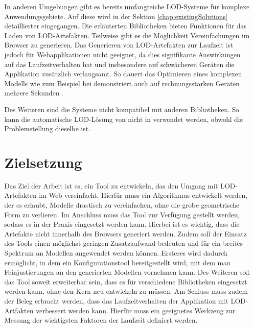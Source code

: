 In anderen Umgebungen gibt es bereits umfangreiche LOD-Systeme für komplexe Anwendungsgebiete. Auf diese wird in der Sektion \autoref{chap:existingSolutions} detaillierter eingegangen.
Die erläuterten Bibliotheken bieten Funktionen für das Laden von LOD-Artefakten. Teilweise gibt es die Möglichkeit Vereinfachungen im Browser zu generieren. Das Generieren von LOD-Artefakten zur Laufzeit ist jedoch für Webapplikationen nicht geeignet, da dies signifikante Auswirkungen auf das Laufzeitverhalten hat und insbesondere auf schwächeren Geräten die Applikation zusätzlich verlangsamt.
So dauert das Optimieren eines komplexen Modells wie zum Beispiel bei  demonstriert auch auf rechnungsstarken Geräten mehrere Sekunden \cite{babylonAutoLod}.

Des Weiteren sind die Systeme nicht kompatibel mit anderen Bibliotheken. So kann die automatische LOD-Lösung von  nicht in  verwendet werden, obwohl die Problemstellung dieselbe ist.

\section{Zielsetzung}
Das Ziel der Arbeit ist es, ein Tool zu entwickeln, das den Umgang mit LOD-Artefakten im Web vereinfacht. Hierfür muss ein Algorithmus entwickelt werden, der es erlaubt, Modelle drastisch zu vereinfachen, ohne die grobe geometrische Form zu verlieren. Im Anschluss muss das Tool zur Verfügung gestellt werden, sodass es in der Praxis eingesetzt werden kann. Hierbei ist es wichtig, dass die Artefakte nicht innerhalb des Browsers generiert werden. Zudem soll der Einsatz des Tools einen möglichst geringen Zusatzaufwand bedeuten und für ein breites Spektrum an Modellen angewendet werden können. Ersteres wird dadurch ermöglicht, in dem ein Konfigurationstool bereitgestellt wird, mit dem man Feinjustierungen an den generierten Modellen vornehmen kann. Des Weiteren soll das Tool soweit erweiterbar sein, dass es für verschiedene Bibliotheken eingesetzt werden kann, ohne den Kern neu entwickeln zu müssen. Am Schluss muss zudem der Beleg erbracht werden, dass das Laufzeitverhalten der Applikation mit LOD-Artfakten verbessert werden kann. Hierfür muss ein geeignetes Werkzeug zur Messung der wichtigsten Faktoren der Laufzeit definiert werden.
